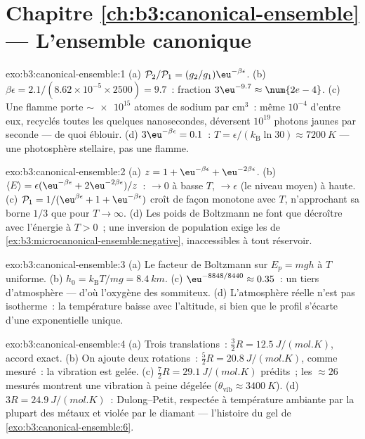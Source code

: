 \section*{Chapitre \ref{ch:b3:canonical-ensemble} --- L'ensemble canonique}

\begin{solution}{exo:b3:canonical-ensemble:1}
(a) $\mathcal P_2/\mathcal P_1 = (g_2/g_1)\eu^{-\beta\epsilon}$.
(b) $\beta\epsilon = 2.1/(8.62\times10^{-5} \times 2500) = 9.7$~:
fraction $3\eu^{-9.7} \approx \num{2e-4}$. (c) Une flamme porte
$\sim\num{e15}$ atomes de sodium par cm$^3$~: même $10^{-4}$ d'entre
eux, recyclés toutes les quelques nanosecondes, déversent $10^{19}$
photons jaunes par seconde --- de quoi éblouir. (d)
$3\eu^{-\beta\epsilon} = 0.1$~:
$T = \epsilon/(k_{\text{B}}\ln30) \approx \qty{7200}{K}$ --- une
photosphère stellaire, pas une flamme.
\end{solution}

\begin{solution}{exo:b3:canonical-ensemble:2}
(a) $z = 1 + \eu^{-\beta\epsilon} + \eu^{-2\beta\epsilon}$. (b)
$\langle E\rangle = \epsilon(\eu^{-\beta\epsilon} +
2\eu^{-2\beta\epsilon})/z$~: $\to 0$ à basse $T$, $\to \epsilon$
(le niveau moyen) à haute. (c) $\mathcal P_1 = 1/(\eu^{\beta
\epsilon} + 1 + \eu^{-\beta\epsilon})$ croît de façon monotone avec
$T$, n'approchant sa borne $1/3$ que pour $T \to \infty$. (d) Les
poids de Boltzmann ne font que décroître avec l'énergie à $T > 0$~;
une inversion de population exige les  de
\cref{ex:b3:microcanonical-ensemble:negative}, inaccessibles à tout
réservoir.
\end{solution}

\begin{solution}{exo:b3:canonical-ensemble:3}
(a) Le facteur de Boltzmann sur $E_p = mgh$ à $T$ uniforme. (b) $h_0 =
k_{\text{B}}T/mg = \qty{8.4}{km}$. (c) $\eu^{-8848/8440} \approx
0.35$~: un tiers d'atmosphère --- d'où l'oxygène des sommiteux.
(d) L'atmosphère réelle n'est pas isotherme~: la température baisse
avec l'altitude, si bien que le profil s'écarte d'une exponentielle
unique.
\end{solution}

\begin{solution}{exo:b3:canonical-ensemble:4}
(a) Trois translations~: $\tfrac32 R = \qty{12.5}{J/(mol.K)}$, accord
exact. (b) On ajoute deux rotations~: $\tfrac52 R =
\qty{20.8}{J/(mol.K)}$, comme mesuré~: la vibration est gelée. (c)
$\tfrac72 R = \qty{29.1}{J/(mol.K)}$ prédits~; les $\approx26$
mesurés montrent une vibration à peine dégelée ($\theta_{\text{vib}}
\approx \qty{3400}{K}$). (d) $3R = \qty{24.9}{J/(mol.K)}$~:
Dulong--Petit, respectée à température ambiante par la plupart des
métaux et violée par le diamant --- l'histoire du gel de
\cref{exo:b3:canonical-ensemble:6}.
\end{solution}

